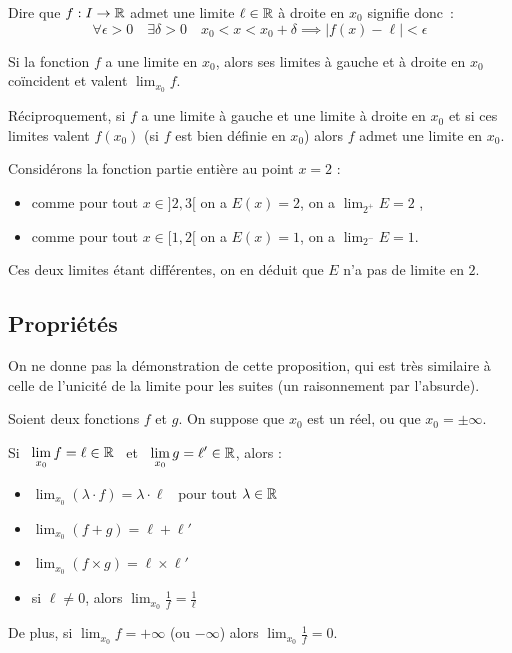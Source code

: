 \documentclass[class=report,crop=false]{standalone}
\begin{document}
Dire que $f:I\to\mathbb{R}$ admet une limite $\ell\in\mathbb{R}$ à droite en $x_0$ signifie donc~:
\[
\forall \epsilon>0 \quad \exists \delta>0 \quad x_0<x <x_0+\delta
\implies \vert f(x)-\ell\vert <\epsilon
\]

Si la fonction $f$ a une limite en $x_0$, alors ses limites à gauche et à droite en
$x_0$ co\"incident et valent $\displaystyle\lim_{x_0} f$.


Réciproquement, si $f$ a une limite à gauche et une limite à droite en $x_0$ et
si ces limites valent $f(x_0)$ (si $f$ est bien définie en $x_0$)
alors $f$ admet une limite en $x_0$.


\begin{exemple}
Considérons la fonction partie entière au point $x=2$ :
\begin{itemize}
\item comme pour tout $x\in]2,3[$ on a $E(x)=2$, on a $\displaystyle\lim_{2^+} E = 2$ ,
\item comme pour tout $x\in[1,2[$ on a $E(x)=1$, on a $\displaystyle\lim_{2^-} E = 1$.
\end{itemize}
Ces deux limites étant différentes, on en déduit que $E$ n'a pas de limite en $2$.

\end{exemple}



\subsection{Propriétés}

\begin{proposition}\sauteligne
{}
\end{proposition}

On ne donne pas la démonstration de cette proposition, qui est très similaire à celle de
l'unicité de la limite pour les suites (un raisonnement par l'absurde).

\bigskip

Soient deux fonctions $f$ et $g$. On suppose que $x_0$ est un réel, ou que $x_0=\pm\infty$.

\begin{proposition}
Si \  $\displaystyle\lim_{x_0} f=\ell\in\mathbb{R}$ \  et \  $\displaystyle\lim_{x_0} g=\ell'\in\mathbb{R}$, alors :
\begin{itemize}
  \item $\displaystyle\lim_{x_0} (\lambda\cdot f)=\lambda\cdot \ell$ \ pour tout $\lambda\in\mathbb{R}$
  \item $\displaystyle\lim_{x_0} (f+g) = \ell+\ell'$
  \item $\displaystyle\lim_{x_0} (f\times g) = \ell\times \ell'$
  \item si $\ell\neq 0$, alors $\displaystyle\lim_{x_0} \frac1f = \frac1\ell$
\end{itemize}
De plus, si $\displaystyle\lim_{x_0} f=+\infty$ (ou $-\infty$) alors $\displaystyle\lim_{x_0} \frac1f = 0$.
\end{proposition}
\end{document}
